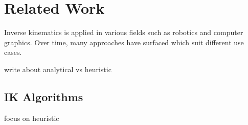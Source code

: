 \chapter{Related Work}
Inverse kinematics is applied in various fields such as robotics and computer
graphics. Over time, many approaches have surfaced which suit different use
cases. 

write about analytical vs heuristic
\section{IK Algorithms}
focus on heuristic
